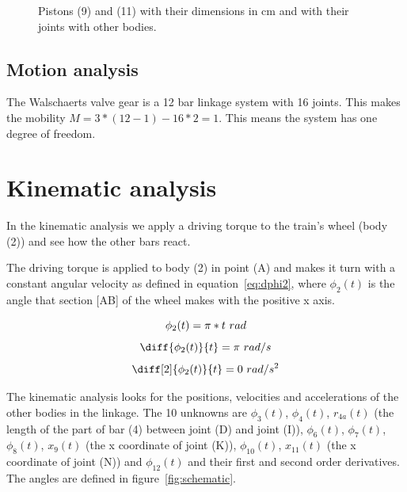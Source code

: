 \documentclass[a4paper]{article}
\begin{document}
\begin{figure}
	\caption{Pistons (9) and (11) with their dimensions in cm and with their joints with other bodies.}
	\label{fig:pistons}
	
\end{figure}



\subsection{Motion analysis}

The Walschaerts valve gear is a 12 bar linkage system with 16 joints. This makes the mobility \(M=3*(12-1)-16*2=1\). This means the system has one degree of freedom.



\section{Kinematic analysis}
\label{sec:kin}

In the kinematic analysis we apply a driving torque to the train's wheel (body (2)) and see how the other bars react. 

The driving torque is applied to body (2) in point (A) and makes it turn with a constant angular velocity as defined in equation~\ref{eq:dphi2}, where \(\phi_2(t)\) is the angle that section [AB] of the wheel makes with the positive x axis.

\begin{equation}
	\phi_2(t) = \pi*t~rad \\
\end{equation}
\begin{equation}
	\diff{\phi_2(t)}{t} = \pi~rad/s \\
	\label{eq:dphi2}
\end{equation}
\begin{equation}
	\diff[2]{\phi_2(t)}{t} = 0~rad/s^2\\
\end{equation}

The kinematic analysis looks for the positions, velocities and accelerations of the other bodies in the linkage. The 10 unknowns are \(\phi_3(t)\), \(\phi_4(t)\), \(r_{4a}(t)\) (the length of the part of bar (4) between joint (D) and joint (I)), \(\phi_6(t)\), \(\phi_7(t)\), \(\phi_8(t)\), \(x_9(t)\) (the x coordinate of joint (K)), \(\phi_{10}(t)\), \(x_{11}(t)\) (the x coordinate of joint (N)) and \(\phi_{12}(t)\) and their first and second order derivatives. The angles are defined in figure~\ref{fig:schematic}.
\end{document}
